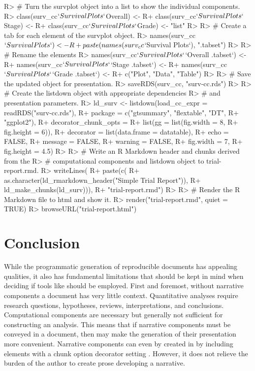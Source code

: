 \documentclass[
]{jss}
\begin{document}
\begin{CodeChunk}

\begin{CodeInput}
R> # Turn the survplot object into a list to show the individual components.
R> class(surv_cc$`Survival Plots`$Overall) <- 
R+   class(surv_cc$`Survival Plots`$Stage) <-
R+   class(surv_cc$`Survival Plots`$Grade) <- "list"
R> 
R> # Create a tab for each element of the survplot object.
R> names(surv_cc$`Survival Plots`) <- 
R+   paste(names(surv_cc$`Survival Plots`), "{.tabset}")
R> 
R> # Rename the elements
R> names(surv_cc$`Survival Plots`$`Overall {.tabset}`) <- 
R+   names(surv_cc$`Survival Plots`$`Stage {.tabset}`) <- 
R+   names(surv_cc$`Survival Plots`$`Grade {.tabset}`) <- 
R+   c("Plot", "Data", "Table")
R>   
R> # Save the updated object for presentation.
R> saveRDS(surv_cc, "surv-cc.rds")
R> 
R> # Create the listdown object with appropriate dependencies
R> # and presentation parameters.
R> ld_surv <- listdown(load_cc_expr = readRDS("surv-cc.rds"),
R+                     package = c("gtsummary", "flextable", "DT", 
R+                                 "ggplot2"),
R+                     decorator_chunk_opts = 
R+                       list(gg = list(fig.width = 8,
R+                                      fig.height = 6)),
R+                     decorator = list(data.frame = datatable),
R+                     echo = FALSE,
R+                     message = FALSE,
R+                     warning = FALSE,
R+                     fig.width = 7,
R+                     fig.height = 4.5)
R> 
R> # Write an R Markdown header and chunks derived from the 
R> # computational components and listdown object to trial-report.rmd.
R> writeLines(
R+   paste(c(
R+     as.character(ld_rmarkdown_header("Simple Trial Report")),
R+     ld_make_chunks(ld_surv))),
R+   "trial-report.rmd")
R> 
R> # Render the R Markdown file to html and show it.
R> render("trial-report.rmd", quiet = TRUE)
R> browseURL("trial-report.html")
\end{CodeInput}
\end{CodeChunk}

\hypertarget{conclusion}{%
\section{Conclusion}\label{conclusion}}

While the programmatic generation of reproducible documents has
appealing qualities, it also has fundamental limitations that should be
kept in mind when deciding if tools like  should be
employed. First and foremost, without narrative components a document
has very little context. Quantitative analyses require research
questions, hypotheses, reviews, interpretations, and conclusions.
Computational components are necessary but generally not sufficient for
constructing an analysis. This means that if narrative components must
be conveyed in a document, then  may make the generation
of their presentation more convenient. Narrative components can even by
created in  by including  elements with a
chunk option decorator setting . However, it
does not relieve the burden of the author to create prose developing a
narrative.
\end{document}
